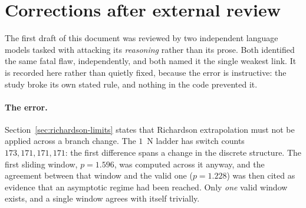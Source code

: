 \documentclass[11pt]{article}
\begin{document}
\begin{abstract}
The investigation then changed method. Because mesh convergence is inherently
\emph{comparative}---it needs two solutions and therefore a proof they are the
same---we replaced it with an \emph{absolute} measurement of a single
solution: does the interpolated trajectory satisfy the continuous Pontryagin
necessary conditions, and to what residual? That measurement succeeded where
the ladder failed, and it produced a sharp answer.
Section~\ref{sec:phase3} reports it: the residual is the local truncation
error of the trapezoidal rule, scaling as $h^3$ with a coefficient fixed by the
orbital dynamics, peaking at apogee, and essentially independent of the
bang-bang switch structure. An attempt to convert that residual into kilograms then failed review for the
second time, and Section~\ref{sec:corrections2} records why. What survives is a
\emph{lower bound}: two $10$~N solutions at identical node count, differing only
in node placement, have final masses $0.1456$~kg apart. A defensible point
estimate of the discretization error remains out of reach, and the reason is
now understood---these solutions are so basin-fragile that a $2\%$ change in the
mesh reorganizes their switch structure, which is itself the study's most
robust result.
\end{abstract}

\tableofcontents

\section{Corrections after external review}
\label{sec:corrections}

The first draft of this document was reviewed by two independent language
models tasked with attacking its \emph{reasoning} rather than its prose. Both
identified the same fatal flaw, independently, and both named it the single
weakest link. It is recorded here rather than quietly fixed, because the error
is instructive: the study broke its own stated rule, and nothing in the code
prevented it.

\paragraph{The error.} Section~\ref{sec:richardson-limits} states that
Richardson extrapolation must not be applied across a branch change. The $1$~N
ladder has switch counts $173, 171, 171, 171$: the first difference spans a
change in the discrete structure. The first sliding window, $p = 1.596$, was
computed across it anyway, and the agreement between that window and the valid
one ($p = 1.228$) was then cited as evidence that an asymptotic regime had been
reached. Only \emph{one} valid window exists, and a single window agrees with
itself trivially.
\end{document}
